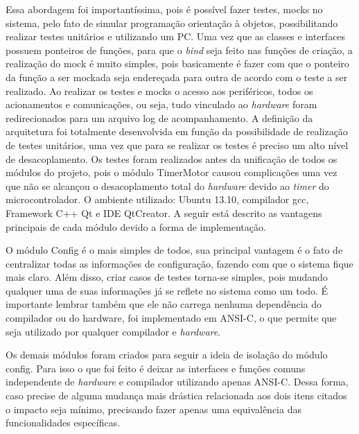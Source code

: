 Essa abordagem foi importantíssima, pois é possível fazer testes, mocks no sistema, pelo fato de simular programação orientação à objetos, possibilitando realizar testes unitários e utilizando um PC. Uma vez que as classes e interfaces possuem ponteiros de funções, para que o \emph{bind} seja feito nas funções de criação, a realização do mock é muito simples, pois basicamente é fazer com que o ponteiro da função a ser mockada seja endereçada para outra de acordo com o teste a ser realizado. Ao realizar os testes e mocks o acesso aos periféricos, todos os acionamentos e comunicações, ou seja, tudo vinculado ao \emph{hardware} foram redirecionados para um arquivo log de acompanhamento. A definição da arquitetura foi totalmente desenvolvida em função da possibilidade de realização de testes unitários, uma vez que para se realizar os testes é preciso um alto nível de desacoplamento. Os testes foram realizados antes da unificação de todos os módulos do projeto, pois o módulo TimerMotor causou complicações uma vez que não se alcançou o desacoplamento total do \emph{hardware} devido ao \emph{timer} do microcontrolador. O ambiente utilizado: Ubuntu 13.10, compilador gcc, Framework C++ Qt e IDE QtCreator. A seguir está descrito as vantagens principais de cada módulo devido a forma de implementação.

O módulo Config é o mais simples de todos, sua principal vantagem é o fato de centralizar todas as informações de configuração, fazendo com que o sistema fique mais claro. Além disso, criar casos de testes torna-se simples, pois mudando qualquer uma de suas informações já se reflete no sistema como um todo. É importante lembrar também que ele não carrega nenhuma dependência do compilador ou do hardware, foi implementado em ANSI-C, o que permite que seja utilizado por qualquer compilador e \emph{hardware}.

Os demais módulos foram criados para seguir a ideia de isolação do módulo config. Para isso o que foi feito é deixar as interfaces e funções comuns independente de \emph{hardware} e compilador utilizando apenas ANSI-C. Dessa forma, caso precise de alguma mudança mais drástica relacionada aos dois itens citados o impacto seja mínimo, precisando fazer apenas uma equivalência das funcionalidades específicas. 

